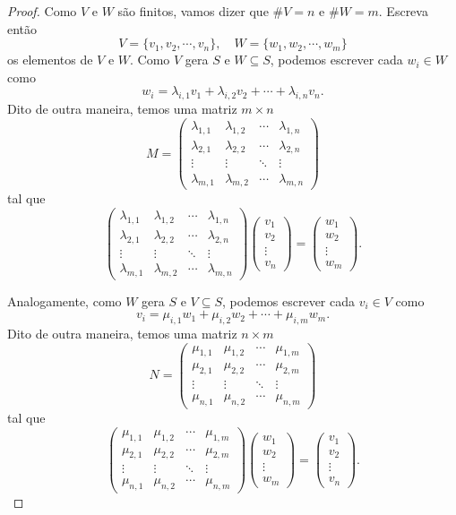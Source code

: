 \begin{proof}
	Como $V$ e $W$ são finitos, vamos dizer que $\#V=n$ e $\#W=m$. Escreva então
	\[V=\{v_1,v_2,\cdots,v_n\},\quad W=\{w_1,w_2,\cdots,w_m\}\]os elementos de $V$ e $W$. Como $V$ gera $S$ e $W\subseteq S$, podemos escrever cada $w_i\in W$ como
	\[w_i=\lambda_{i,1}v_1+\lambda_{i,2}v_2+\cdots+\lambda_{i,n}v_n.\] Dito de outra maneira, temos uma matriz $m\times n$
	\[M=\begin{pmatrix}
	\lambda_{1,1}&\lambda_{1,2}&\cdots&\lambda_{1,n}\\
	\lambda_{2,1}&\lambda_{2,2}&\cdots&\lambda_{2,n}\\
	\vdots&\vdots&\ddots&\vdots\\
	\lambda_{m,1}&\lambda_{m,2}&\cdots&\lambda_{m,n}
	\end{pmatrix}\]tal que
	\[\begin{pmatrix}
	\lambda_{1,1}&\lambda_{1,2}&\cdots&\lambda_{1,n}\\
	\lambda_{2,1}&\lambda_{2,2}&\cdots&\lambda_{2,n}\\
	\vdots&\vdots&\ddots&\vdots\\
	\lambda_{m,1}&\lambda_{m,2}&\cdots&\lambda_{m,n}
	\end{pmatrix}\begin{pmatrix}
	v_1\\v_2\\\vdots\\v_n
	\end{pmatrix}=\begin{pmatrix}
	w_1\\w_2\\\vdots\\w_m
	\end{pmatrix}.\]
	
	Analogamente, como $W$ gera $S$ e $V\subseteq S$, podemos escrever cada $v_i\in V$ como
	\[v_i=\mu_{i,1}w_1+\mu_{i,2}w_2+\cdots+\mu_{i,m}w_m.\]Dito de outra maneira, temos uma matriz $n\times m$
	\[N=\begin{pmatrix}
	\mu_{1,1}&\mu_{1,2}&\cdots&\mu_{1,m}\\
	\mu_{2,1}&\mu_{2,2}&\cdots&\mu_{2,m}\\
	\vdots&\vdots&\ddots&\vdots\\
	\mu_{n,1}&\mu_{n,2}&\cdots&\mu_{n,m}
	\end{pmatrix}\]tal que
	\[\begin{pmatrix}
	\mu_{1,1}&\mu_{1,2}&\cdots&\mu_{1,m}\\
	\mu_{2,1}&\mu_{2,2}&\cdots&\mu_{2,m}\\
	\vdots&\vdots&\ddots&\vdots\\
	\mu_{n,1}&\mu_{n,2}&\cdots&\mu_{n,m}
	\end{pmatrix}\begin{pmatrix}
	w_1\\w_2\\\vdots\\w_m
	\end{pmatrix}=\begin{pmatrix}
	v_1\\v_2\\\vdots\\v_n
	\end{pmatrix}.\]
	

\end{proof}
